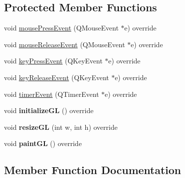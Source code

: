 \subsection*{Protected Member Functions}
\begin{DoxyCompactItemize}
\item 
void \mbox{\hyperlink{class_application_1_1_c_window_application_aef3f8b560cf3193a189c144835f2d587}{mouse\+Press\+Event}} (Q\+Mouse\+Event $\ast$e) override
\item 
void \mbox{\hyperlink{class_application_1_1_c_window_application_a83bbf972b387045d653452d7d141b9d6}{mouse\+Release\+Event}} (Q\+Mouse\+Event $\ast$e) override
\item 
void \mbox{\hyperlink{class_application_1_1_c_window_application_af1af209c30d9f7b591da4aedcd4a03df}{key\+Press\+Event}} (Q\+Key\+Event $\ast$e) override
\item 
void \mbox{\hyperlink{class_application_1_1_c_window_application_accb1924fd48cf14b2fe467f65766b52e}{key\+Release\+Event}} (Q\+Key\+Event $\ast$e) override
\item 
void \mbox{\hyperlink{class_application_1_1_c_window_application_ab591f7f6a68b752a4df2ecffebf22c04}{timer\+Event}} (Q\+Timer\+Event $\ast$e) override
\item 
\mbox{\label{class_application_1_1_c_window_application_ab6f0e2b97311923b75018f95fdb9f530}} 
void {\bfseries initialize\+GL} () override
\item 
\mbox{\label{class_application_1_1_c_window_application_a800ed87ab31e543abb36254ea89e873e}} 
void {\bfseries resize\+GL} (int w, int h) override
\item 
\mbox{\label{class_application_1_1_c_window_application_a988cd6144cfeec0b0dd2513c56d4b226}} 
void {\bfseries paint\+GL} () override
\end{DoxyCompactItemize}


\subsection{Member Function Documentation}
\mbox{\label{class_application_1_1_c_window_application_af1af209c30d9f7b591da4aedcd4a03df}} 
